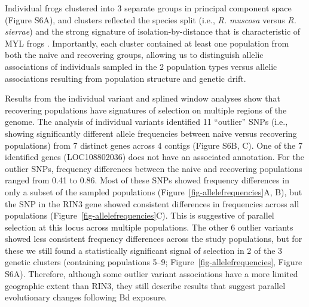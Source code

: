 \documentclass[9pt,twocolumn,twoside,lineno]{pnas-new}
\begin{document}
Individual frogs clustered into 3 separate groups in principal component
space (Figure S6A), and clusters reflected
the species split (i.e., \emph{R. muscosa} versus \emph{R. sierrae}) and
the strong signature of isolation-by-distance that is characteristic of
MYL frogs \citep{rothstein2020, poorten2017, byrne2023}. Importantly,
each cluster contained at least one population from both the naive and
recovering groups, allowing us to distinguish allelic associations of
individuals sampled in the 2 population types versus allelic
associations resulting from population structure and genetic drift.

Results from the individual variant and splined window analyses show
that recovering populations have signatures of selection on multiple
regions of the genome. The analysis of individual variants identified 11
``outlier'' SNPs (i.e., showing significantly different allele
frequencies between naive versus recovering populations) from 7 distinct
genes across 4 contigs (Figure S6B, C). One
of the 7 identified genes (LOC108802036) does not have an associated
annotation. For the outlier SNPs, frequency differences between the
naive and recovering populations ranged from 0.41 to 0.86. Most of these
SNPs showed frequency differences in only a subset of the sampled
populations (Figure~\ref{fig-allelefrequencies}A, B), but the SNP in
the RIN3 gene showed consistent differences in frequencies across all
populations (Figure~\ref{fig-allelefrequencies}C). This is suggestive
of parallel selection at this locus across multiple populations. The
other 6 outlier variants showed less consistent frequency differences
across the study populations, but for these we still found a
statistically significant signal of selection in 2 of the 3 genetic
clusters (containing populations 5--9;
Figure~\ref{fig-allelefrequencies}, Figure S6A). Therefore, although some outlier variant associations have a more
limited geographic extent than RIN3, they still describe results that
suggest parallel evolutionary changes following Bd exposure.
\end{document}
